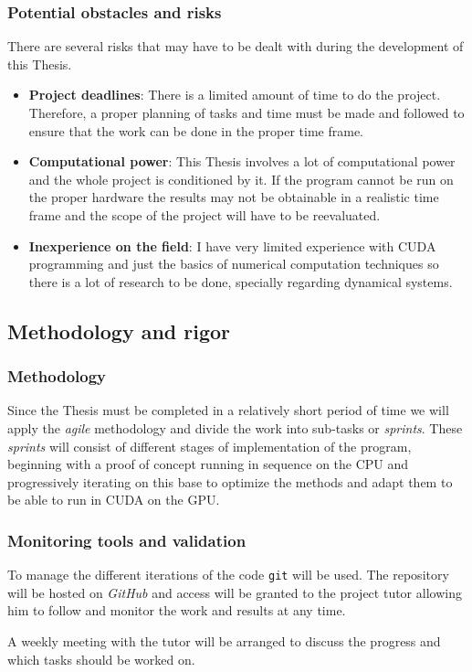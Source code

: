 \subsubsection{Potential obstacles and risks}

There are several risks that may have to be dealt with during the development of this Thesis.

\begin{itemize}
    \item \textbf{Project deadlines}: There is a limited amount of time to do
        the project. Therefore, a proper planning of tasks and time must be made
        and followed to ensure that the work can be done in the proper time
        frame.
    \item \textbf{Computational power}: This Thesis involves a lot of
        computational power and the whole project is conditioned by it. If the
        program cannot be run on the proper hardware the results may not be
        obtainable in a realistic time frame and the scope of the project will
        have to be reevaluated.
    \item \textbf{Inexperience on the field}: I have very limited experience
        with CUDA programming and just the basics of numerical computation
        techniques so there is a lot of research to be done, specially regarding
        dynamical systems.
\end{itemize}

\pagebreak
\subsection{Methodology and rigor}

\subsubsection{Methodology}

Since the Thesis must be completed in a relatively short period of time we will
apply the \emph{agile} methodology and divide the work into sub-tasks or
\emph{sprints}. These \emph{sprints} will consist of different stages of
implementation of the program, beginning with a proof of concept running in
sequence on the CPU and progressively iterating on this base to optimize the
methods and adapt them to be able to run in CUDA on the GPU.

\subsubsection{Monitoring tools and validation}

To manage the different iterations of the code \texttt{git} will be used. The
repository will be hosted on \emph{GitHub} and access will be granted to the
project tutor allowing him to follow and monitor the work and results at any
time.

A weekly meeting with the tutor will be arranged to discuss the progress and
which tasks should be worked on.
